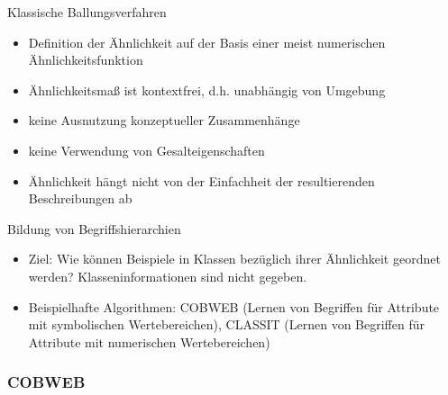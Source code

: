 \documentclass[paper=a4, fontsize=11pt]{scrartcl} %
\numberwithin{equation}{section} %
\numberwithin{figure}{section} %
\numberwithin{table}{section} %
\begin{document}
Klassische Ballungsverfahren
\begin{itemize}
\item Definition der Ähnlichkeit auf der Basis einer meist numerischen Ähnlichkeitsfunktion
\item Ähnlichkeitsmaß ist kontextfrei, d.h. unabhängig von Umgebung
\item keine Ausnutzung konzeptueller Zusammenhänge
\item keine Verwendung von Gesalteigenschaften
\item Ähnlichkeit hängt nicht von der Einfachheit der resultierenden Beschreibungen ab
\end{itemize}

Bildung von Begriffshierarchien
\begin{itemize}
\item Ziel: Wie können Beispiele in Klassen bezüglich ihrer Ähnlichkeit geordnet werden? Klasseninformationen sind nicht gegeben.
\item Beispielhafte Algorithmen: COBWEB (Lernen von Begriffen für Attribute mit symbolischen Wertebereichen), CLASSIT (Lernen von Begriffen für Attribute mit numerischen Wertebereichen)
\end{itemize}

\subsubsection{COBWEB}
\end{document}
